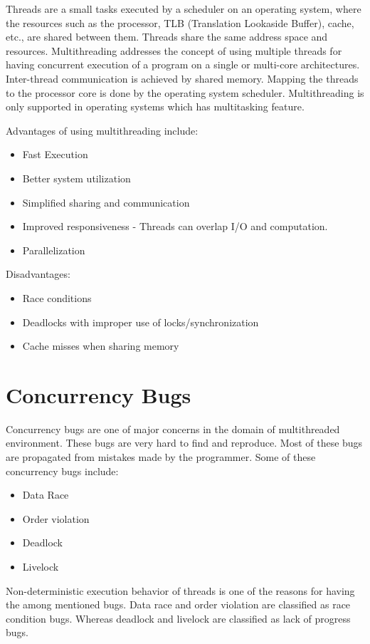 Threads are a small tasks executed by a scheduler on an operating system, where the resources such as the processor, TLB (Translation Lookaside Buffer), cache, etc., are shared between them. 
Threads share the same address space and resources. 
Multithreading addresses the concept of using multiple threads for having concurrent execution of a program on a single or multi-core architectures. 
Inter-thread communication is achieved by shared memory. 
Mapping the threads to the processor core is done by the operating system scheduler. 
Multithreading is only supported in operating systems which has multitasking feature. 

Advantages of using multithreading include: 
\begin{itemize}
\item	Fast Execution
\item	Better system utilization
\item	Simplified sharing  and communication
\item 	Improved responsiveness - Threads can overlap I/O and computation.
\item	Parallelization
\end{itemize}

Disadvantages:
\begin{itemize}
\item	Race conditions
\item	Deadlocks with improper use of locks/synchronization
\item	Cache misses when sharing memory
\end{itemize}

\section{Concurrency Bugs}

Concurrency bugs are one of major concerns in the domain of multithreaded environment. 
These bugs are very hard to find and reproduce. 
Most of these bugs are propagated from mistakes made by the programmer\cite{lopez2017study}. 
Some of these concurrency bugs include:
\begin{itemize}
\item	Data Race
\item 	Order violation
\item	Deadlock
\item	Livelock
\end{itemize}

Non-deterministic execution behavior of threads is one of the reasons for having the among mentioned bugs. 
Data race and order violation are classified as race condition bugs. 
Whereas deadlock and livelock are classified as lack of progress bugs. 

